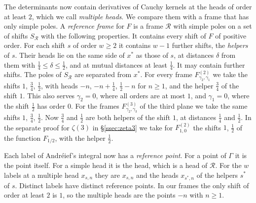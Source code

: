 \documentclass[11pt]{amsart}
\theoremstyle{definition}
\theoremstyle{remark}
\numberwithin{equation}{section}
\begin{document}
The determinants now contain derivatives of Cauchy kernels at the heads of order at least $2$, which we call
\emph{multiple heads}. We compare them with a frame that has only simple poles. A \emph{reference frame} for $F$ is a
frame $\mathcal R$ with simple poles on a set of shifts $S_{\mathcal R}$ with the following properties. It contains every
shift of $F$ of positive order. For each shift $s$ of order $w\ge2$ it contains $w-1$ further shifts, the \emph{helpers}
of $s$. Their heads lie on the same side of $x^*$ as those of $s$, at distances $\delta$ from them with
$\frac14\le\delta\le\frac12$, and at mutual distances at least $\frac14$. It may contain further shifts. The poles of
$S_{\mathcal R}$ are separated from $x^*$. For every frame $F^{(2)}_{\gamma_2,\gamma_1}$ we take the shifts $1$,
$\frac34$, $\frac12$, with heads $-n$, $-n+\frac14$, $\frac12-n$ for $n\ge1$, and the helper $\frac34$ of the shift
$1$. This also serves $\gamma_2=0$, where all orders are at most $1$, and $\gamma_1=0$, where the shift $\frac12$ has
order $0$. For the frames $F^{(3)}_{\gamma_2,\gamma_3}$ of the third plane we take the same shifts $1$, $\frac34$,
$\frac12$. Now $\frac34$ and $\frac12$ are both helpers of the shift $1$, at distances $\frac14$ and $\frac12$. In the
separate proof for $\zeta(3)$ in \S\ref{ssec:zeta3} we take for $F^{(2)}_{1,0}$ the shifts $1$, $\frac12$ of the
function $F_{1/2}$, with the helper $\frac12$.

Each label of Andr\'eief's integral now has a \emph{reference point}. For a point of $\Gamma$ it is the point itself.
For a simple head it is the head, which is a head of $\mathcal R$. For the $w$ labels at a multiple head $x_{s,n}$ they
are $x_{s,n}$ and the heads $x_{s^*,n}$ of the helpers $s^*$ of $s$. Distinct labels have distinct reference points. In
our frames the only shift of order at least $2$ is $1$, so the multiple heads are the points $-n$ with $n\ge1$.
\end{document}

